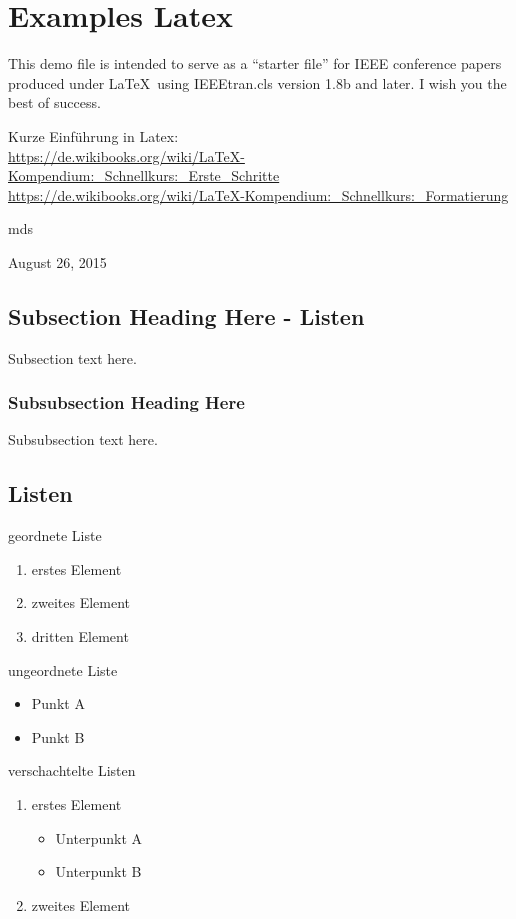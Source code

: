 
\section{Examples Latex}
This demo file is intended to serve as a ``starter file''
for IEEE conference papers produced under \LaTeX\ using
IEEEtran.cls version 1.8b and later.
I wish you the best of success.

Kurze Einführung in Latex: \\ \url{https://de.wikibooks.org/wiki/LaTeX-Kompendium:_Schnellkurs:_Erste_Schritte} \\
\url{https://de.wikibooks.org/wiki/LaTeX-Kompendium:_Schnellkurs:_Formatierung}

\hfill mds

\hfill August 26, 2015

\subsection{Subsection Heading Here - Listen}
Subsection text here.

\subsubsection{Subsubsection Heading Here}
Subsubsection text here.

\subsection{Listen}
geordnete Liste
\begin{enumerate}
\item erstes Element
\item zweites Element
\item dritten Element
\end{enumerate}

ungeordnete Liste
\begin{itemize}
\item Punkt A
\item Punkt B
\end{itemize}

verschachtelte Listen
\begin{enumerate}
\item erstes Element
  \begin{itemize}
  \item Unterpunkt A
  \item Unterpunkt B
  \end{itemize}
\item zweites Element
\end{enumerate}

